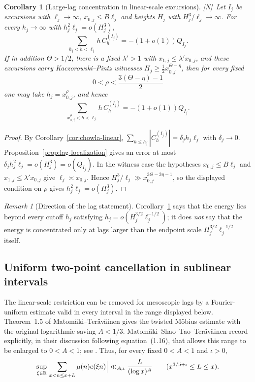 \documentclass[11pt]{amsart}
\numberwithin{equation}{section}
\theoremstyle{plain}
\newtheorem{corollary}[theorem]{Corollary}
\theoremstyle{definition}
\theoremstyle{remark}
\newtheorem{remark}[theorem]{Remark}
\newcommand{\tagN}{\textup{[N]}}
\begin{document}
\begin{corollary}[Large-lag concentration in linear-scale excursions]
\label{cor:large-lag}
\tagN\ Let $I_j$ be excursions with $\ell_j\to\infty$, $x_{0,j}\le B\ell_j$ and
heights $H_j$ with $H_j^3/\ell_j\to\infty$. For every $h_j\to\infty$ with
$h_j^2\ell_j=o(H_j^3)$,
\[
\sum_{h_j<h<\ell_j}h\,C^{(I_j)}_h=-(1+o(1))Q_{I_j}.
\]
If in addition $\Theta>1/2$, there is a fixed $\lambda'>1$ with
$x_{1,j}\le\lambda' x_{0,j}$, and these excursions carry
Kaczorowski--Pintz witnesses
$H_j\ge\frac12x_{0,j}^{\Theta-\eta}$, then for every fixed
\[
0<\rho<\frac{3(\Theta-\eta)-1}{2}
\]
one may take $h_j=x_{0,j}^{\rho}$, and hence
\[
\sum_{x_{0,j}^{\rho}<h<\ell_j}h\,C_h^{(I_j)}=-(1+o(1))Q_{I_j}.
\]
\end{corollary}

\begin{proof}
By Corollary~\ref{cor:chowla-linear},
$\sum_{h\le h_j}|C^{(I_j)}_h|=\delta_jh_j\ell_j$ with $\delta_j\to0$.
Proposition~\ref{prop:lag-localization} gives an error at most
$\delta_jh_j^2\ell_j=o(H_j^3)=o(Q_{I_j})$. In the witness case the hypotheses
$x_{0,j}\le B\ell_j$ and $x_{1,j}\le\lambda' x_{0,j}$ give
$\ell_j\asymp x_{0,j}$.  Hence
$H_j^3/\ell_j\gg x_{0,j}^{3\Theta-3\eta-1}$, so the displayed condition on
$\rho$ gives $h_j^2\ell_j=o(H_j^3)$.
\end{proof}

\begin{remark}[Direction of the lag statement]
\label{rem:large-lag-direction}
Corollary~\ref{cor:large-lag} says that the energy lies beyond every cutoff
$h_j$ satisfying $h_j=o(H_j^{3/2}\ell_j^{-1/2})$; it does \emph{not} say
that the energy is concentrated only at lags larger than the endpoint scale
$H_j^{3/2}\ell_j^{-1/2}$ itself.
\end{remark}

\subsection{Uniform two-point cancellation in sublinear intervals}
\label{subsec:sublinear-chowla}

The linear-scale restriction can be removed for mesoscopic lags by a
Fourier-uniform estimate valid in every interval in the range displayed
below. Theorem~1.5 of Matom\"aki--Ter\"av\"ainen
\cite{MatomakiTeravainen2023} gives the twisted M\"obius estimate with the
original logarithmic saving $A<1/3$. Matom\"aki--Shao--Tao--Ter\"av\"ainen
record explicitly, in their discussion following equation~(1.16), that
\cite[Remark~5.2]{MatomakiTeravainen2023} allows this range to be enlarged
to $0<A<1$; see \cite[discussion following (1.16)]{MSTT23}. Thus, for
every fixed $0<A<1$ and $\iota>0$,
\begin{equation}
\label{eq:MT-fourier}
\sup_{\xi\in\mathbb R}\Bigl|\sum_{x<n\le x+L}\mu(n)e(\xi n)\Bigr|
\ll_{A,\iota}\frac{L}{(\log x)^A}
\qquad(x^{3/5+\iota}\le L\le x).
\end{equation}
\end{document}
